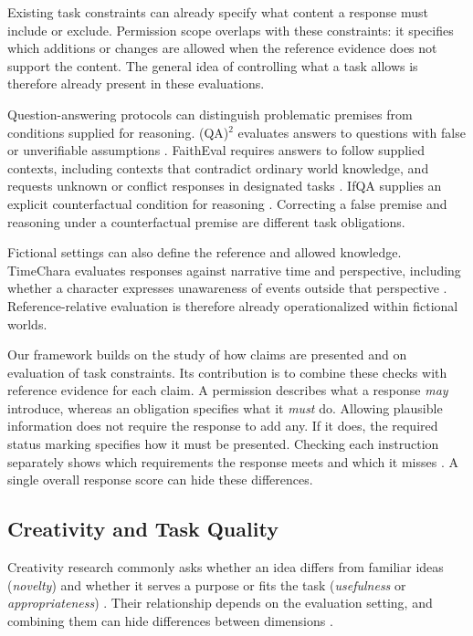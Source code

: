 \documentclass{clv2025}
\begin{document}
Existing task constraints can already specify what content a response
must include or exclude. Permission scope overlaps with these constraints:
it specifies which additions or changes are allowed when the reference
evidence does not support the content. The general idea of controlling
what a task allows is therefore already present in these evaluations.

Question-answering protocols can distinguish problematic premises from
conditions supplied for reasoning. (QA)$^2$ evaluates answers to questions
with false or unverifiable assumptions \citep{kim_qa2_2023}.
FaithEval requires answers to follow supplied contexts, including contexts
that contradict ordinary world knowledge, and requests unknown or conflict
responses in designated tasks \citep{ming_faitheval_2025}.
IfQA supplies an explicit counterfactual condition for reasoning
\citep{yu_ifqa_2023}. Correcting a false premise and reasoning under a
counterfactual premise are different task obligations.

Fictional settings can also define the reference and allowed knowledge.
TimeChara evaluates responses against narrative time and perspective,
including whether a character expresses unawareness of events outside
that perspective \citep{ahn_timechara_2024}. Reference-relative evaluation
is therefore already operationalized within fictional worlds.

Our framework builds on the study of how claims are presented and on
evaluation of task constraints. Its contribution is to combine these
checks with reference evidence for each claim.
A permission describes what a response \emph{may} introduce, whereas an
obligation specifies what it \emph{must} do. Allowing plausible information does
not require the response to add any. If it does, the required status
marking specifies how it must be presented. Checking each instruction
separately shows which requirements the response meets and which it
misses \citep{lee_mcjudgebench_2026}. A single overall response score can
hide these differences.

\subsection{Creativity and Task Quality}\label{subsec:creativity}

Creativity research commonly asks whether an idea differs from familiar
ideas (\emph{novelty}) and whether it serves a purpose or fits the task
(\emph{usefulness} or \emph{appropriateness})
\citep{runco_standard_2012,diedrich_are_2015}.
Their relationship depends on the evaluation setting, and combining them can
hide differences between dimensions \citep{pichot_reflective_2024}.
\end{document}
